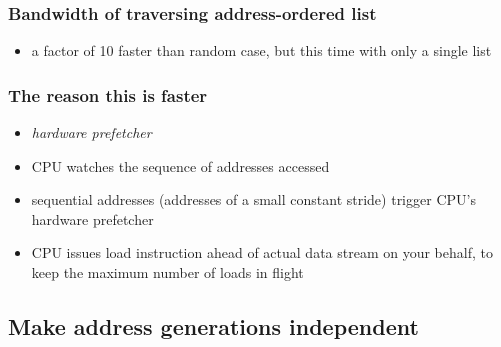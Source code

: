 \documentclass[12pt,dvipdfmx]{beamer}
\newcommand{\ao}[1]{{\color{blue}#1}}
\begin{document}
\begin{frame}
\frametitle{Bandwidth of traversing address-ordered list}

\begin{itemize}
\item a factor of 10 faster than random case, but this time
  with only a single list
\begin{center}
  {\scriptsize}
\end{center}

\end{itemize}
\end{frame}

\begin{frame}
\frametitle{The reason this is faster}
\begin{itemize}
\item \ao{\em hardware prefetcher}
\item CPU watches the sequence of addresses accessed
\item sequential addresses (addresses of a small constant stride) 
  trigger CPU's hardware prefetcher
\item CPU issues load instruction ahead of actual data stream
  on your behalf, to keep the maximum number of loads in flight
\end{itemize}

\begin{center}
\def\svgwidth{0.5\textwidth}
{\footnotesize }
\end{center}

\end{frame}

\subsection{Make address generations independent}
\end{document}
